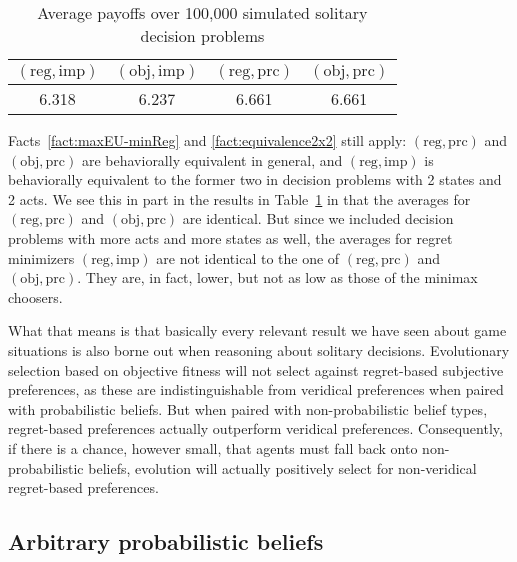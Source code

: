 \documentclass[fleqn,reqno,11pt]{article}
\begin{document}
\begin{table}
  \centering
  \begin{tabular}{cccc}
    \toprule
   $(\text{reg}, \text{imp})$ 
 & $(\text{obj}, \text{imp})$ 
 & $(\text{reg}, \text{prc})$ 
 & $(\text{obj}, \text{prc})$ 
 \\ \midrule
    6.318 & 6.237 & 6.661 & 6.661 \\ \bottomrule
  \end{tabular}
  \caption{Average payoffs over 100,000 simulated solitary decision problems}
  \label{tab:SolitaryDecisions}
\end{table}

Facts~\ref{fact:maxEU-minReg} and \ref{fact:equivalence2x2} still apply:
$(\text{reg}, \text{prc})$ and $(\text{obj}, \text{prc})$ are behaviorally equivalent
in general, and $(\text{reg}, \text{imp})$ is behaviorally equivalent to the former two in
decision problems with 2 states and 2 acts.  We see this in part in the
results in Table~\ref{tab:SolitaryDecisions} in that the averages for $(\text{reg},
  \text{prc})$ and $(\text{obj}, \text{prc})$ are identical. But since we included decision
problems with more acts and more states as well, the averages for regret minimizers
$(\text{reg}, \text{imp})$ are not identical to the one of $(\text{reg},
  \text{prc})$ and $(\text{obj}, \text{prc})$. They are, in fact, lower, but not as low as
those of the minimax choosers. 

What that means is that basically every relevant result we have seen about game situations is also borne out
when reasoning about solitary decisions. Evolutionary selection based on objective fitness will
not select against regret-based subjective preferences, as these are indistinguishable from
veridical preferences when paired with probabilistic beliefs. But when paired with
non-probabilistic belief types, regret-based preferences actually outperform veridical
preferences. Consequently, if there is a chance, however small, that agents must fall back onto
non-probabilistic beliefs, evolution will actually positively select for non-veridical
regret-based preferences.


\iffalse
\subsection{Arbitrary probabilistic beliefs}
\label{sec:arbitr-prob-beli}
\end{document}
